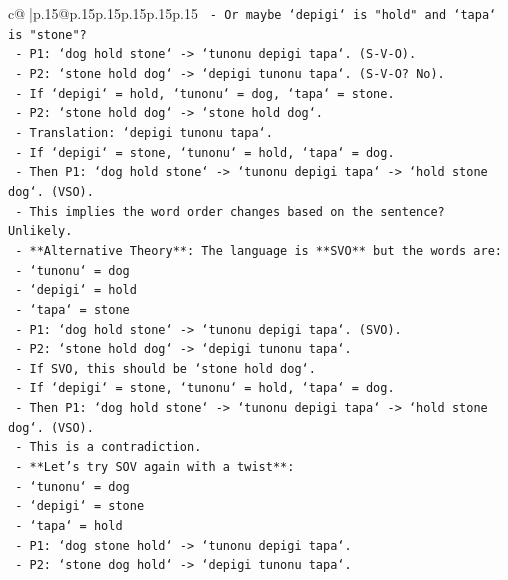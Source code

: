 \documentclass{article}
\begin{document}
{\begin{supertabular}{c@{$\;$}|p{.15\linewidth}@{}p{.15\linewidth}p{.15\linewidth}p{.15\linewidth}p{.15\linewidth}p{.15\linewidth}}
{{{\texttt{       {-} Or maybe `depigi` is "hold" and `tapa` is "stone"?} \\
\texttt{         {-} P1: `dog hold stone` {-}> `tunonu depigi tapa`. (S{-}V{-}O).} \\
\texttt{         {-} P2: `stone hold dog` {-}> `depigi tunonu tapa`. (S{-}V{-}O? No).} \\
\texttt{         {-} If `depigi` = hold, `tunonu` = dog, `tapa` = stone.} \\
\texttt{         {-} P2: `stone hold dog` {-}> `stone hold dog`.} \\
\texttt{         {-} Translation: `depigi tunonu tapa`.} \\
\texttt{         {-} If `depigi` = stone, `tunonu` = hold, `tapa` = dog.} \\
\texttt{         {-} Then P1: `dog hold stone` {-}> `tunonu depigi tapa` {-}> `hold stone dog`. (VSO).} \\
\texttt{         {-} This implies the word order changes based on the sentence? Unlikely.} \\
\texttt{     {-} **Alternative Theory**: The language is **SVO** but the words are:} \\
\texttt{       {-} `tunonu` = dog} \\
\texttt{       {-} `depigi` = hold} \\
\texttt{       {-} `tapa` = stone} \\
\texttt{       {-} P1: `dog hold stone` {-}> `tunonu depigi tapa`. (SVO).} \\
\texttt{       {-} P2: `stone hold dog` {-}> `depigi tunonu tapa`.} \\
\texttt{         {-} If SVO, this should be `stone hold dog`.} \\
\texttt{         {-} If `depigi` = stone, `tunonu` = hold, `tapa` = dog.} \\
\texttt{         {-} Then P1: `dog hold stone` {-}> `tunonu depigi tapa` {-}> `hold stone dog`. (VSO).} \\
\texttt{         {-} This is a contradiction.} \\
\texttt{     {-} **Let's try SOV again with a twist**:} \\
\texttt{       {-} `tunonu` = dog} \\
\texttt{       {-} `depigi` = stone} \\
\texttt{       {-} `tapa` = hold} \\
\texttt{       {-} P1: `dog stone hold` {-}> `tunonu depigi tapa`.} \\
\texttt{       {-} P2: `stone dog hold` {-}> `depigi tunonu tapa`.} \\
}}}
\end{supertabular}}
\end{document}
